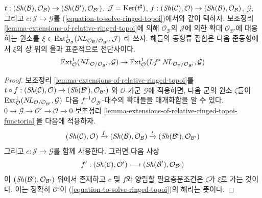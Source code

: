 \begin{lemma}
\label{lemma-parametrize-solutions-ringed-topoi}
$t : (\mathop{\mathit{Sh}}\nolimits(\mathcal{B}), \mathcal{O}_\mathcal{B}) \to
(\mathop{\mathit{Sh}}\nolimits(\mathcal{B}'), \mathcal{O}_{\mathcal{B}'})$,
$\mathcal{J} = \mathop{\mathrm{Ker}}(t^\sharp)$,
$f : (\mathop{\mathit{Sh}}\nolimits(\mathcal{C}), \mathcal{O}) \to
(\mathop{\mathit{Sh}}\nolimits(\mathcal{B}), \mathcal{O}_\mathcal{B})$, $\mathcal{G}$, 그리고
$c : \mathcal{J} \to \mathcal{G}$를
(\ref{equation-to-solve-ringed-topoi})에서와 같이 택하자. 보조정리
\ref{lemma-extensions-of-relative-ringed-topoi}에 의해
$\mathcal{O}_\mathcal{B}$의 $\mathcal{J}$에 의한 확대
$\mathcal{O}_{\mathcal{B}'}$에 대응하는 원소를
$\xi \in \mathop{\mathrm{Ext}}\nolimits^1_{\mathcal{O}_\mathcal{B}}(
\mathop{N\!L}\nolimits_{\mathcal{O}_\mathcal{B}/\mathcal{O}_{\mathcal{B}'}}, \mathcal{J})$
라 쓰자. 해들의 동형류 집합은 다음 준동형에서 $\xi$의 상 위의 올과
표준적으로 전단사이다.
$$
\mathop{\mathrm{Ext}}\nolimits^1_\mathcal{O}(\mathop{N\!L}\nolimits_{\mathcal{O}/\mathcal{O}_{\mathcal{B}'}},
\mathcal{G})\to
\mathop{\mathrm{Ext}}\nolimits^1_\mathcal{O}(
Lf^*\mathop{N\!L}\nolimits_{\mathcal{O}_\mathcal{B}/\mathcal{O}_{\mathcal{B}'}}, \mathcal{G})
$$
\end{lemma}

\begin{proof}
보조정리 \ref{lemma-extensions-of-relative-ringed-topoi}를
$t \circ f : (\mathop{\mathit{Sh}}\nolimits(\mathcal{C}), \mathcal{O}) \to
(\mathop{\mathit{Sh}}\nolimits(\mathcal{B}'), \mathcal{O}_{\mathcal{B}'})$
와 $\mathcal{O}$-가군 $\mathcal{G}$에 적용하면, 다음 군의 원소
$\zeta$들이
$\mathop{\mathrm{Ext}}\nolimits^1_\mathcal{O}(\mathop{N\!L}\nolimits_{\mathcal{O}/\mathcal{O}_{\mathcal{B}'}},
\mathcal{G})$
다음 $f^{-1}\mathcal{O}_{\mathcal{B}'}$-대수의 확대들을 매개화함을
알 수 있다.
$0 \to \mathcal{G} \to \mathcal{O}' \to \mathcal{O} \to 0$
보조정리
\ref{lemma-extensions-of-relative-ringed-topoi-functorial}을 다음에
적용하자.
$$
(\mathop{\mathit{Sh}}\nolimits(\mathcal{C}), \mathcal{O}) \xrightarrow{f}
(\mathop{\mathit{Sh}}\nolimits(\mathcal{B}), \mathcal{O}_\mathcal{B}) \xrightarrow{t}
(\mathop{\mathit{Sh}}\nolimits(\mathcal{B}'), \mathcal{O}_{\mathcal{B}'})
$$
그리고 $c : \mathcal{J} \to \mathcal{G}$를 함께 사용한다. 그러면
다음 사상
$$
f' : 
(\mathop{\mathit{Sh}}\nolimits(\mathcal{C}), \mathcal{O}')
\longrightarrow
(\mathop{\mathit{Sh}}\nolimits(\mathcal{B}'), \mathcal{O}_{\mathcal{B}'})
$$
이 $(\mathop{\mathit{Sh}}\nolimits(\mathcal{B}'), \mathcal{O}_{\mathcal{B}'})$ 위에서 존재하고
$c$ 및 $f$와 양립할 필요충분조건은 $\zeta$가 $\xi$로 가는 것이다.
이는 정확히 $\mathcal{O}'$이
(\ref{equation-to-solve-ringed-topoi})의 해라는 뜻이다.
\end{proof}






















